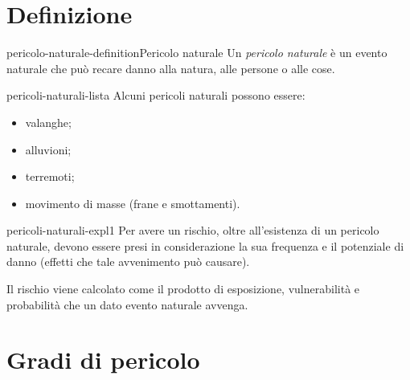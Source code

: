 \documentclass[preview]{standalone}
\begin{document}
\genpage

\section{Definizione}

\begin{snippetdefinition}{pericolo-naturale-definition}{Pericolo naturale}
    Un \textit{pericolo naturale} è un evento naturale che può recare danno alla
    natura, alle persone o alle cose.
\end{snippetdefinition}

\begin{snippet}{pericoli-naturali-lista}
    Alcuni pericoli naturali possono essere:
    \begin{itemize}
        \item valanghe;
        \item alluvioni;
        \item terremoti;
        \item movimento di masse (frane e smottamenti).
    \end{itemize}
\end{snippet}

\begin{snippet}{pericoli-naturali-expl1}
    Per avere un rischio, oltre all'esistenza di un pericolo naturale, devono essere presi
    in considerazione la sua frequenza e il potenziale di danno (effetti che tale
    avvenimento può causare).

    Il rischio viene calcolato come il prodotto di
    esposizione, vulnerabilità e probabilità che un dato evento naturale avvenga.
\end{snippet}

\section{Gradi di pericolo}

\end{document}

